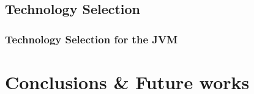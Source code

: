 \documentclass[presentation]{beamer}\mode<presentation>{\usetheme{AMSBolognaFC}}
\begin{document}
\subsection{Technology Selection}

\begin{frame}%
    \frametitle{Technology Selection for the JVM}

    

\end{frame}

\section{Conclusions \& Future works}
\end{document}
